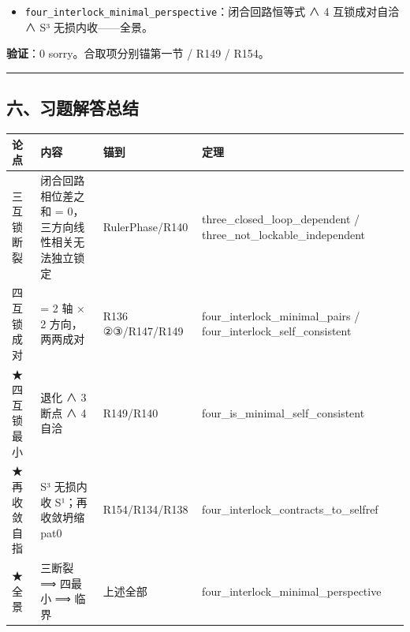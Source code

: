 \documentclass[
]{article}
\newcounter{none} %
\providecommand{\tightlist}{%
  \setlength{\itemsep}{0pt}\setlength{\parskip}{0pt}}
\begin{document}
\begin{itemize}
\tightlist
\item
  \texttt{four\_interlock\_minimal\_perspective}：闭合回路恒等式 ∧ 4
  互锁成对自洽 ∧ S³ 无损内收------全景。
\end{itemize}

\textbf{验证}：0 sorry。合取项分别锚第一节 / R149 / R154。

\begin{center}\rule{0.5\linewidth}{0.5pt}\end{center}

\subsection{六、习题解答总结}\label{ux516dux4e60ux9898ux89e3ux7b54ux603bux7ed3}

{\def\LTcaptype{none} %
\begin{longtable}[]{@{}
  >{\raggedright\arraybackslash}p{}
  >{\raggedright\arraybackslash}p{}
  >{\raggedright\arraybackslash}p{}
  >{\raggedright\arraybackslash}p{}@{}}
\toprule\noalign{}
\begin{minipage}[b]{\linewidth}\raggedright
论点
\end{minipage} & \begin{minipage}[b]{\linewidth}\raggedright
内容
\end{minipage} & \begin{minipage}[b]{\linewidth}\raggedright
锚到
\end{minipage} & \begin{minipage}[b]{\linewidth}\raggedright
定理
\end{minipage} \\
\midrule\noalign{}
\endhead
\bottomrule\noalign{}
\endlastfoot
三互锁断裂 & 闭合回路相位差之和 = 0，三方向线性相关无法独立锁定 &
RulerPhase/R140 & three\_closed\_loop\_dependent /
three\_not\_lockable\_independent \\
四互锁成对 & 4 = 2 轴 × 2 方向，两两成对 & R136 ②③/R147/R149 &
four\_interlock\_minimal\_pairs / four\_interlock\_self\_consistent \\
★四互锁最小 & 1 退化 ∧ 3 断点 ∧ 4 自洽 & R149/R140 &
four\_is\_minimal\_self\_consistent \\
★再收敛自指 & S³ 无损内收 S¹；再收敛坍缩 pat0 & R154/R134/R138 &
four\_interlock\_contracts\_to\_selfref \\
★全景 & 三断裂 ⟹ 四最小 ⟹ 临界 & 上述全部 &
four\_interlock\_minimal\_perspective \\
\end{longtable}
}
\end{document}
